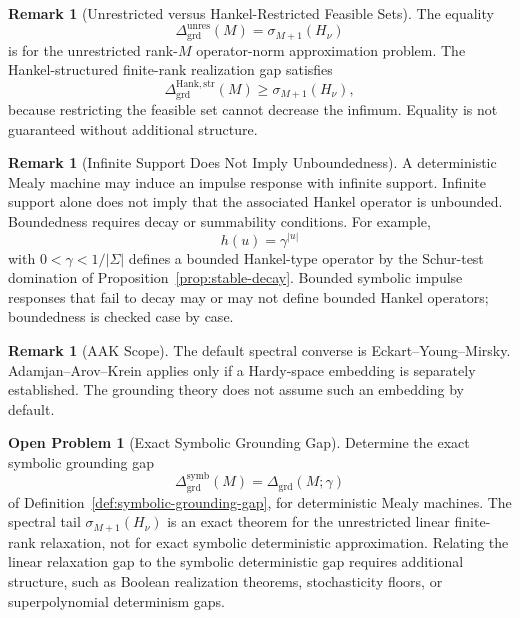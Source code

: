 \documentclass[12pt]{article}
\theoremstyle{definition}
\newtheorem{remark}[theorem]{Remark}
\newtheorem{openproblem}[theorem]{Open Problem}
\newcommand{\Dunres}{\Delta_{\mathrm{grd}}^{\mathrm{unres}}}
\newcommand{\DHankstr}{\Delta_{\mathrm{grd}}^{\mathrm{Hank,str}}}
\begin{document}
\begin{remark}[Unrestricted versus Hankel-Restricted Feasible Sets]
\label{rem:grounding-unrestricted-restricted}
The equality
\[
\Dunres(M)
=
\sigma_{M+1}(H_\nu)
\]
is for the unrestricted rank-$M$ operator-norm approximation problem.  The
Hankel-structured finite-rank realization gap satisfies
\[
\DHankstr(M)
\ge
\sigma_{M+1}(H_\nu),
\]
because restricting the feasible set cannot decrease the infimum.  Equality is
not guaranteed without additional structure.
\end{remark}

\begin{remark}[Infinite Support Does Not Imply Unboundedness]
\label{rem:infinite-support-grounding}
A deterministic Mealy machine may induce an impulse response with infinite
support.  Infinite support alone does not imply that the associated Hankel
operator is unbounded.  Boundedness requires decay or summability conditions.
For example,
\[
h(u)=\gamma^{|u|}
\]
with $0<\gamma<1/|\Sigma|$ defines a bounded Hankel-type operator by the
Schur-test domination of Proposition~\ref{prop:stable-decay}.  Bounded symbolic
impulse responses that fail to decay may or may not define bounded Hankel
operators; boundedness is checked case by case.
\end{remark}

\begin{remark}[AAK Scope]
\label{rem:grounding-aak}
The default spectral converse is Eckart--Young--Mirsky.  Adamjan--Arov--Krein
applies only if a Hardy-space embedding is separately established.  The
grounding theory does not assume such an embedding by default.
\end{remark}

\begin{openproblem}[Exact Symbolic Grounding Gap]
\label{open:symbolic-grounding}
Determine the exact symbolic grounding gap
\[
\Delta_{\mathrm{grd}}^{\mathrm{symb}}(M)
=
\Delta_{\mathrm{grd}}(M;\gamma)
\]
of Definition~\ref{def:symbolic-grounding-gap}, for deterministic Mealy
machines.  The spectral tail
$\sigma_{M+1}(H_\nu)$ is an exact theorem for the unrestricted linear
finite-rank relaxation, not for exact symbolic deterministic approximation.
Relating the linear relaxation gap to the symbolic deterministic gap requires
additional structure, such as Boolean realization theorems, stochasticity
floors, or superpolynomial determinism gaps.
\end{openproblem}

\end{document}

